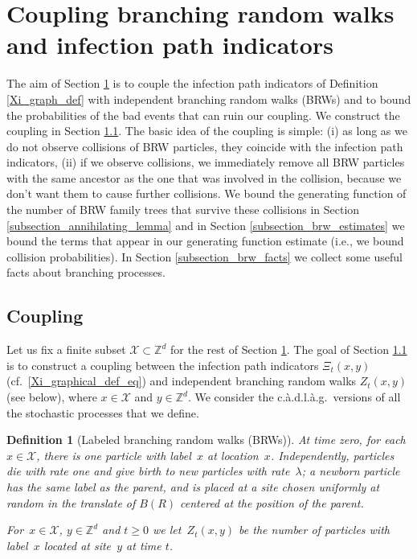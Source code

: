 \documentclass[a4paper,12pt]{article}
\newtheorem  {definition}    [theorem]{Definition}
\newcommand{\Z}{\mathbb{Z}}
\begin{document}
\section{Coupling branching random walks and infection path indicators}
\label{section_graphical_construction}


The aim of Section \ref{section_graphical_construction} is to couple the infection path indicators of Definition \ref{Xi_graph_def} with independent branching random walks (BRWs)
and to bound the probabilities of the bad events that can ruin our coupling.
We construct the coupling in Section \ref{subsection_coupling}. The basic idea of the coupling is simple: (i) as long as we do not observe collisions of BRW particles, they coincide with the infection path indicators, (ii) if we observe collisions, we immediately remove all BRW particles with the same ancestor as the one that was involved in the collision, because we don't want them
to cause further collisions. We bound the generating function of the number of BRW family trees that survive these collisions in Section \ref{subsection_annihilating_lemma}  and in Section \ref{subsection_brw_estimates} we bound the terms that appear in our generating function estimate (i.e., we bound collision probabilities). In Section \ref{subsection_brw_facts} we collect some useful facts about branching processes.



\subsection{Coupling}
\label{subsection_coupling}

Let us fix a finite subset $\mathcal{X} \subset \mathbb{Z}^d$ for the rest of Section \ref{section_graphical_construction}.
The goal of Section \ref{subsection_coupling}  is to construct a coupling between the infection path indicators $\Xi_t(x,y)$ (cf.\ \eqref{Xi_graphical_def_eq})  and independent branching random walks $Z_t(x,y)$ (see below), where $x \in \mathcal{X}$ and $y \in \mathbb{Z}^d$. We consider the c.\`a.d.l.\`a.g.\ versions of all the stochastic processes that we define.


\begin{definition}[Labeled branching random walks (BRWs)]
\label{def_brw_from_X}
 At time zero, for each~$x \in \mathcal{X}$, there is one particle with label~$x$ at location~$x$.
 Independently, particles die with rate one and give birth to new particles with rate~$\lambda$; a newborn particle has the same label as the parent, and is placed at a site chosen uniformly at random in the translate of $B(R)$ centered at the position of the parent.

  For~$x \in \mathcal{X}$, $y \in \Z^d$ and $t \geq 0$ we let~$Z_t(x,y)$ be the number of particles with label~$x$ located at site~$y$ at time $t$.
\end{definition}
\end{document}
